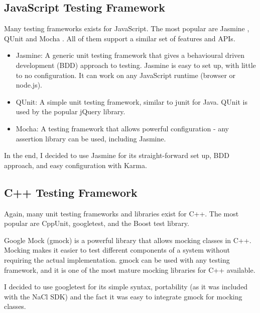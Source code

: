 
\subsection{JavaScript Testing Framework} %
\label{sub:js_test_framework}
Many testing frameworks exists for JavaScript. The most popular are Jasmine \cite{jasminetest}, QUnit \cite{qunittest} and Mocha \cite{mochatest}. All of them support a similar set of features and APIs. 

\begin{itemize}
	\item Jasmine: A generic unit testing framework that gives a behavioural driven development (BDD) approach to testing. Jasmine is easy to set up, with little to no configuration. It can work on any JavaScript runtime (browser or node.js).
	\item QUnit: A simple unit testing framework, similar to junit for Java. QUnit is used by the popular jQuery library. 
	\item Mocha: A testing framework that allows powerful configuration - any assertion library can be used, including Jasmine.
\end{itemize}

In the end, I decided to use Jasmine for its straight-forward set up, BDD approach, and easy configuration with Karma.


\subsection{C++ Testing Framework} %
\label{sub:cpp_testing}
Again, many unit testing frameworks and libraries exist for C++. The most popular are CppUnit, googletest, and the Boost test library.

Google Mock (gmock) is a powerful library that allows mocking classes in C++. Mocking makes it easier to test different components of a system without requiring the actual implementation. gmock can be used with any testing framework, and it is one of the most mature mocking libraries for C++ available.

I decided to use googletest for its simple syntax, portability (as it was included with the NaCl SDK) and the fact it was easy to integrate gmock for mocking classes.


